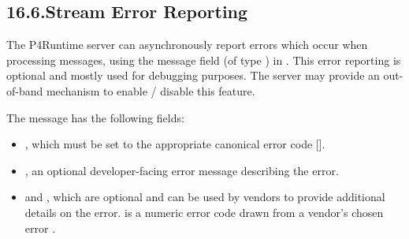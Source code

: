 \documentclass[11pt]{article}
\begin{document}
{%
\subsection{16.6.\hspace*{0.5em}Stream Error Reporting}\label{sec-stream-error-reporting}%

\noindent{}The P4Runtime server can asynchronously report errors which occur when
processing  messages, using the  message field (of
type ) in . This error reporting is
optional and mostly used for debugging purposes. The server may provide an
out-of-band mechanism to enable / disable this feature.%

The  message has the following fields:%

\begin{itemize}[noitemsep,topsep=\mdcompacttopsep]%

\item{}, which must be set to the appropriate canonical error code
[].%

\item{}, an optional developer-facing error message describing the error.%

\item{} and , which are optional and can be used by vendors to provide
additional details on the error.  is a numeric error code drawn from a
vendor's chosen error .%


\end{itemize}}
\end{document}
